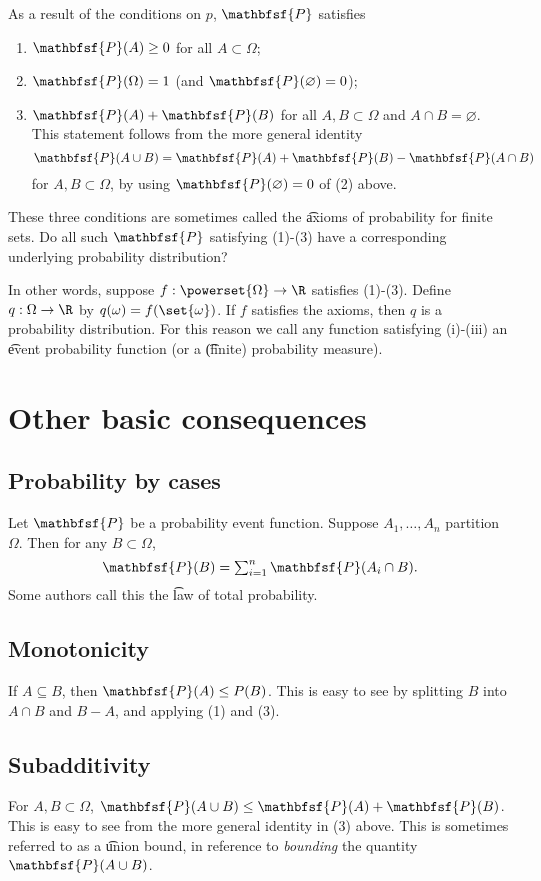 As a result of the conditions on $p$, $\mathbfsf{P} $ satisfies
    \begin{enumerate}
      \item $\mathbfsf{P} (A) \geq 0$ for all $A \subset \Omega $;
      \item $\mathbfsf{P} (\Omega ) = 1$ (and $\mathbfsf{P} (\varnothing) = 0$);
      \item $\mathbfsf{P} (A) + \mathbfsf{P} (B)$ for all $A, B \subset \Omega $ and $A \cap  B = \varnothing$.
This statement follows from the more general identity
\[
\mathbfsf{P} (A \cup B) = \mathbfsf{P} (A) + \mathbfsf{P} (B) - \mathbfsf{P} (A \cap  B)
\]
for $A, B \subset \Omega $, by using $\mathbfsf{P} (\varnothing) = 0$ of (2) above.
    \end{enumerate}

These three conditions are sometimes called the \t{axioms of probability for finite sets}.
Do all such $\mathbfsf{P} $ satisfying (1)-(3) have a corresponding underlying probability distribution?

In other words, suppose $f: \powerset{\Omega } \to \R $ satisfies (1)-(3).
Define $q: \Omega  \to \R $ by $q(\omega ) = f(\set{\omega })$.
If $f$ satisfies the axioms, then $q$ is a probability distribution.
For this reason we call any function satisfying (i)-(iii) an \t{event probability function} (or a \t{(finite) probability measure}).

\section*{Other basic consequences}

\subsection*{Probability by cases}

Let $\mathbfsf{P} $ be a probability event function.
Suppose $A_1, \dots , A_n$ partition $\Omega $.
Then for any $B \subset \Omega $,
\[
\textstyle
\mathbfsf{P} (B) = \sum_{i = 1}^{n} \mathbfsf{P} (A_i \cap  B).
\]
Some authors call this the \t{law of total probability}.

\subsection*{Monotonicity}

If $A \subseteq B$, then $\mathbfsf{P} (A) \leq P(B)$.
This is easy to see by splitting $B$ into $A \cap  B$ and $B - A$, and applying (1) and (3).

\subsection*{Subadditivity}

For $A, B \subset \Omega $, $\mathbfsf{P} (A \cup B) \leq \mathbfsf{P} (A) + \mathbfsf{P} (B)$.
This is easy to see from the more general identity in (3) above.
This is sometimes referred to as a \t{union bound}, in reference to \textit{bounding} the quantity $\mathbfsf{P} (A \cup B)$.
